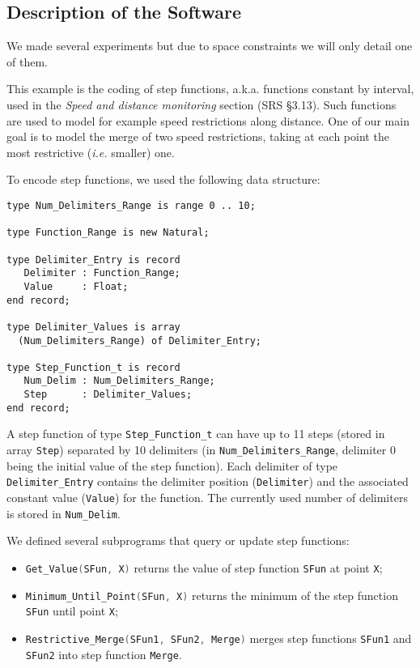 \documentclass[10pt,a4paper,twocolumn]{article}
\newcommand{\ie}{\textit{i.e.}\xspace}
\newcommand{\aka}{a.k.a.\xspace}
\newcommand{\SPARK}[1]{\lstinline[language=Ada,basicstyle={\footnotesize
      \sffamily},framesep=0pt]$#1$}
\begin{document}
\subsection{Description of the Software}

We made several experiments but due to space constraints we will only
detail one of them.

This example is the coding of step functions, \aka functions
constant by interval, used in the \textit{Speed and distance monitoring}
section (SRS §3.13). Such functions are used to model for example
speed restrictions along distance. One of our main goal is to model
the merge of two speed restrictions, taking at each point the most
restrictive (\ie smaller) one.

To encode step functions, we used the following data structure:
\begin{lstlisting}
type Num_Delimiters_Range is range 0 .. 10;

type Function_Range is new Natural;

type Delimiter_Entry is record
   Delimiter : Function_Range;
   Value     : Float;
end record;

type Delimiter_Values is array
  (Num_Delimiters_Range) of Delimiter_Entry;

type Step_Function_t is record
   Num_Delim : Num_Delimiters_Range;
   Step      : Delimiter_Values;
end record;
\end{lstlisting}

A step function of type \SPARK{Step_Function_t} can have up to 11
steps (stored in array \SPARK{Step}) separated by 10 delimiters (in
\SPARK{Num_Delimiters_Range},
delimiter 0 being the initial value of the step function). Each
delimiter of type \SPARK{Delimiter_Entry} contains the delimiter
position (\SPARK{Delimiter}) and the associated constant value
(\SPARK{Value}) for the function. The currently used number of
delimiters is stored in \SPARK{Num_Delim}.

We defined several subprograms that query or update step functions:
\begin{itemize}
\item \SPARK{Get_Value(SFun, X)} returns the value of step function \SPARK{SFun}
  at point \SPARK{X};
\item \SPARK{Minimum_Until_Point(SFun, X)} returns the minimum of the step
  function \SPARK{SFun} until point \SPARK{X};
\item \SPARK{Restrictive_Merge(SFun1, SFun2, Merge)} merges step functions
  \SPARK{SFun1} and \SPARK{SFun2} into step function \SPARK{Merge}.
\end{itemize}
\end{document}
